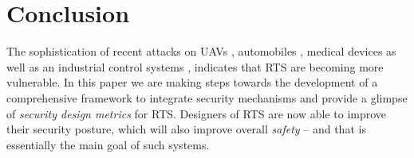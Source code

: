 \documentclass[../rt_server_main.tex]{subfiles}
\begin{document}
\section{Conclusion}

The sophistication of recent attacks  on UAVs \cite{dronhack},
automobiles \cite{ris_rts_1, checkoway2011comprehensive}, medical devices
\cite{security_medical} as well as an industrial control systems \cite{stuxnet}, indicates that RTS are becoming more vulnerable. In this paper we are making steps towards the development of a comprehensive framework to integrate security mechanisms and  provide a glimpse of \textit{security design metrics} for RTS. Designers of RTS are now able to improve their security posture, which will also improve overall \textit{safety} – and that is essentially the main goal of such systems.

 
\end{document}
